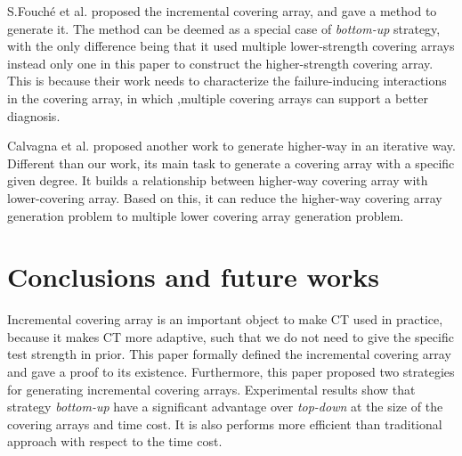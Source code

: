 \documentclass[conference]{IEEEtran}
\theoremstyle{definition}
\begin{document}
S.Fouch{\'e}  et al. \cite{fouche2009incremental} proposed the incremental covering array, and gave a method to generate it. The method can be deemed as a special case of \emph{bottom-up} strategy, with the only difference being that it used multiple lower-strength covering arrays instead only one in this paper to construct the higher-strength covering array. This is because their work needs to characterize the failure-inducing interactions in the covering array, in which ,multiple covering arrays can support a better diagnosis.

Calvagna et al. \cite{calvagna2013incrementally} proposed another work to generate higher-way in an iterative way. Different than our work, its main task to generate a covering array with a specific given degree. It builds a relationship between higher-way covering array with lower-covering array.  Based on this, it can reduce the higher-way covering array generation problem to multiple lower covering array generation problem.
%


\section{Conclusions and future works}
Incremental covering array is an important object to make CT used in practice, because it makes CT more adaptive, such that we do not need to give the specific test strength in prior. This paper formally defined the incremental covering array and gave a proof to its existence. Furthermore, this paper proposed two strategies for generating incremental covering arrays. Experimental results show that strategy \emph{bottom-up} have a significant advantage over \emph{top-down} at the size of the covering arrays and time cost. It is also performs more efficient than traditional approach with respect to the time cost.
\end{document}
